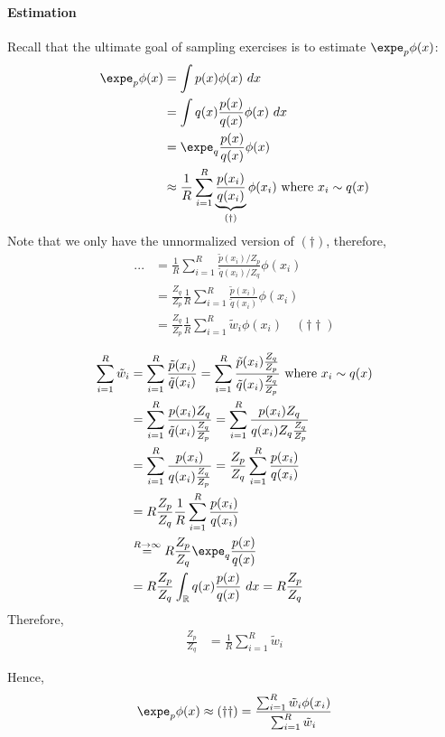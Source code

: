 \documentclass{article}
\begin{document}
	\paragraph{Estimation} Recall that the ultimate goal of sampling exercises is to estimate $\expe_p \phi(x)$:
	\begin{align}
		\expe_p \phi(x) &= \int p(x) \phi(x)\ dx \\
		&= \int q(x) \frac{p(x)}{q(x)} \phi(x)\ dx \\
		&= \expe_q \frac{p(x)}{q(x)} \phi(x) \\
		&\approx \frac{1}{R} \sum_{i=1}^R \underbrace{\frac{p(x_i)}{q(x_i)}}_{(\dagger)} \phi(x_i) \tx{ where } x_i \sim q(x)
	\end{align}
	Note that we only have the unnormalized version of $(\dagger)$, therefore,
	\begin{align}
		... &= \frac{1}{R} \sum_{i=1}^R \frac{\tilde{p}(x_i)/Z_p}{\tilde{q}(x_i)/Z_q} \phi(x_i) \\
		&= \frac{Z_q}{Z_p} \frac{1}{R} \sum_{i=1}^R \frac{\tilde{p}(x_i)}{\tilde{q}(x_i)}\phi(x_i) \\
		&= \frac{Z_q}{Z_p} \frac{1}{R} \sum_{i=1}^R \tilde{w}_i \phi(x_i)\quad (\dagger \dagger)
	\end{align}
	\begin{lemma}
		\begin{align}
			\sum_{i=1}^R \tilde{w}_i
			&= \sum_{i=1}^R \frac{\tilde{p}(x_i)}{\tilde{q}(x_i)}
			= \sum_{i=1}^R \frac{\tilde{p}(x_i) \frac{Z_q}{Z_p}}{\tilde{q}(x_i) \frac{Z_q}{Z_p}} \tx{ where } x_i \sim q(x) \\
			&= \sum_{i=1}^R \frac{p(x_i) Z_q}{\tilde{q}(x_i) \frac{Z_q}{Z_p}} 
			= \sum_{i=1}^R \frac{p(x_i) Z_q}{q(x_i) Z_q \frac{Z_q}{Z_p}} \\
			&= \sum_{i=1}^R \frac{p(x_i)}{q(x_i) \frac{Z_q}{Z_p}}
			= \frac{Z_p}{Z_q} \sum_{i=1}^R \frac{p(x_i)}{q(x_i)} \\
			&= R \frac{Z_p}{Z_q} \frac{1}{R} \sum_{i=1}^R \frac{p(x_i)}{q(x_i)} \\
			&\overset{R \to \infty}{=} R \frac{Z_p}{Z_q} \expe_q \frac{p(x)}{q(x)} \\
			&= R \frac{Z_p}{Z_q} \int_\R q(x) \frac{p(x)}{q(x)}\ dx
			= R \frac{Z_p}{Z_q}
		\end{align}
		Therefore, 
		\begin{align}
			\frac{Z_p}{Z_q} &= \frac{1}{R} \sum_{i=1}^R \tilde{w}_i
		\end{align}
	\end{lemma}
	Hence,
	\begin{align}
		\expe_p \phi(x) \approx (\dagger \dagger) = \frac{\sum_{i=1}^R \tilde{w}_i \phi(x_i)}{\sum_{i=1}^R \tilde{w}_i}
	\end{align}
\end{document}
